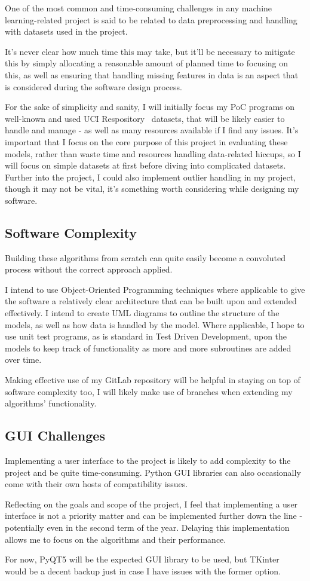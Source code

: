 \documentclass[report,10pt]{article}
\begin{document}
One of the most common and time-consuming challenges in any machine learning-related project is said to be related to data preprocessing and handling with datasets used in the project. \par
It's never clear how much time this may take, but it'll be necessary to mitigate this by simply allocating a reasonable amount of planned time to focusing on this, as well as ensuring that handling missing features in data is an aspect that is considered during the software design process. \par
For the sake of simplicity and sanity, I will initially focus my PoC programs on well-known and used UCI Respository~\cite{uci} datasets, that will be likely easier to handle and manage - as well as many resources available if I find any issues. It's important that I focus on the core purpose of this project in evaluating these models, rather than waste time and resources handling data-related hiccups, so I will focus on simple datasets at first before diving into complicated datasets. Further into the project, I could also implement outlier handling in my project, though it may not be vital, it's something worth considering while designing my software. \par

\subsection{Software Complexity}
Building these algorithms from scratch can quite easily become a convoluted process without the correct approach applied. \par
I intend to use Object-Oriented Programming techniques where applicable to give the software a relatively clear architecture that can be built upon and extended effectively. I intend to create UML diagrams to outline the structure of the models, as well as how data is handled by the model. Where applicable, I hope to use unit test programs, as is standard in Test Driven Development, upon the models to keep track of functionality as more and more subroutines are added over time. \par
Making effective use of my GitLab repository will be helpful in staying on top of software complexity too, I will likely make use of branches when extending my algorithms' functionality. \par
\subsection{GUI Challenges}
Implementing a user interface to the project is likely to add complexity to the project and be quite time-consuming. Python GUI libraries can also occasionally come with their own hosts of compatibility issues. \par
Reflecting on the goals and scope of the project, I feel that implementing a user interface is not a priority matter and can be implemented further down the line - potentially even in the second term of the year. Delaying this implementation allows me to focus on the algorithms and their performance. \par
For now, PyQT5 will be the expected GUI library to be used, but TKinter~\cite{tkinter} would be a decent backup just in case I have issues with the former option.
\end{document}

